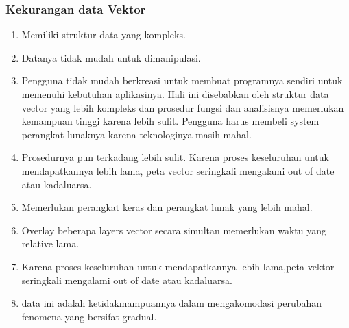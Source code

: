 \begin{enumerate}
\subsubsection{Kekurangan data Vektor}
\begin{enumerate}
kekurangan data vector dibandingkan data raster
terdapat keterbatasan masalah akurasi dan presisi data terutama dalam menentukan ukuran piksel. Data vector memiliki keterbatasan dalam ukuran penyimpanan atau kapasitas hasil.
\item Memiliki struktur data yang kompleks.
\item Datanya tidak mudah untuk dimanipulasi.
\item Pengguna tidak mudah berkreasi untuk membuat programnya sendiri untuk memenuhi kebutuhan aplikasinya. Hali ini disebabkan oleh struktur data vector yang lebih kompleks dan prosedur fungsi dan analisisnya memerlukan kemampuan tinggi karena lebih sulit. Pengguna harus membeli system perangkat lunaknya karena teknologinya masih mahal.
\item Prosedurnya pun terkadang lebih sulit. Karena proses keseluruhan untuk mendapatkannya lebih lama, peta vector seringkali mengalami out of date atau kadaluarsa.
\item Memerlukan perangkat keras dan perangkat lunak yang lebih mahal.
\item Overlay beberapa layers vector secara simultan memerlukan waktu yang relative lama.
\item Karena proses keseluruhan untuk mendapatkannya lebih lama,peta vektor seringkali mengalami out of date atau kadaluarsa.
\item data ini adalah ketidakmampuannya dalam mengakomodasi perubahan fenomena yang bersifat gradual.
\end{enumerate}



\end{enumerate}
